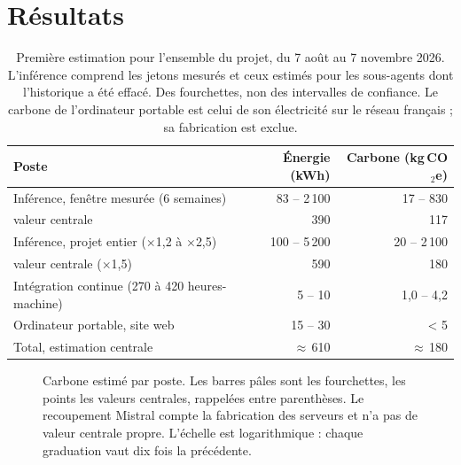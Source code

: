\documentclass[11pt,a4paper]{article}
\newcommand{\rangerow}[5]{%
  \draw[rangefill, line width=7pt] (axis cs:#2,#1) -- (axis cs:#3,#1);
  \if\relax\detokenize{#4}\relax\else\fill[markblue] (axis cs:#4,#1) circle (2.6pt);\fi
  \node[anchor=west, font=\footnotesize, inner sep=3pt] at (axis cs:#3,#1) {#5};}
\begin{document}
\section{Résultats}\label{sec:resultats}

\begin{table}[h]\centering
\begin{tabular}{lrr}
\toprule
Poste & Énergie (kWh) & Carbone (kg\,CO$_2$e)\\
\midrule
Inférence, fenêtre mesurée (6 semaines) & 83 -- 2\,100 & 17 -- 830\\
\quad valeur centrale & 390 & 117\\
Inférence, projet entier ($\times$1,2 à $\times$2,5) & 100 -- 5\,200 & 20 -- 2\,100\\
\quad valeur centrale ($\times$1,5) & 590 & 180\\
Intégration continue (270 à 420 heures-machine) & 5 -- 10 & 1,0 -- 4,2\\
Ordinateur portable, site web & 15 -- 30 & < 5\\
\midrule
Total, estimation centrale & $\approx$\,610 & $\approx$\,180\\
\bottomrule
\end{tabular}
\caption{Première estimation pour l'ensemble du projet, du 7 août au 7 novembre 2026. L'inférence comprend les jetons mesurés et ceux estimés pour les sous-agents dont l'historique a été effacé. Des fourchettes, non des intervalles de confiance. Le carbone de l'ordinateur portable est celui de son électricité sur le réseau français ; sa fabrication est exclue.}\label{tab:resultats}
\end{table}

\begin{figure}[h]\centering
{}
\caption{Carbone estimé par poste. Les barres pâles sont les fourchettes, les points les valeurs centrales, rappelées entre parenthèses. Le recoupement Mistral compte la fabrication des serveurs et n'a pas de valeur centrale propre. L'échelle est logarithmique : chaque graduation vaut dix fois la précédente.}\label{fig:postes}
\end{figure}
\end{document}
